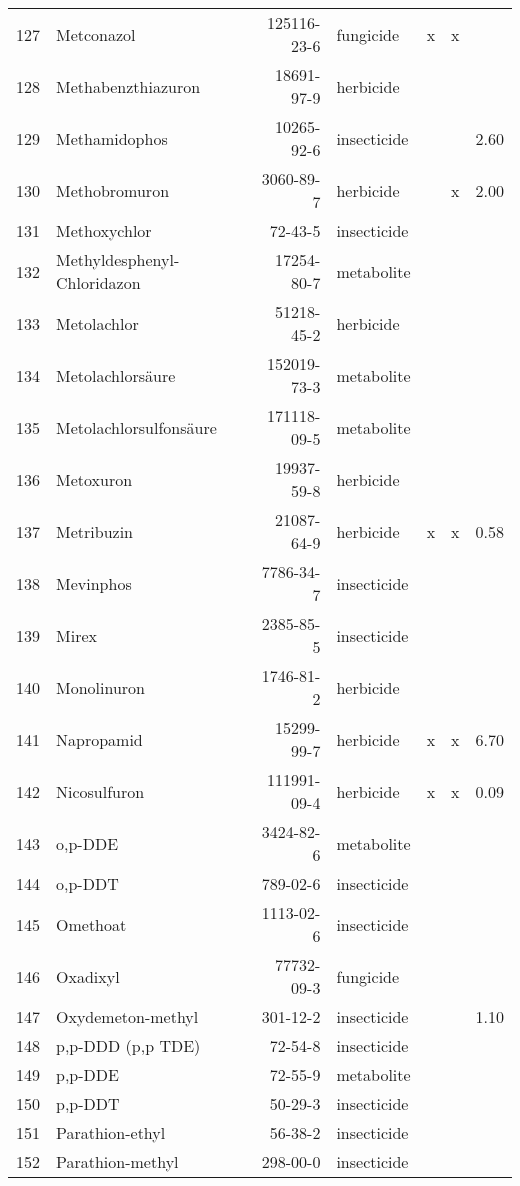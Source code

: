 \begin{longtable}{lp{3cm}rlp{0.5cm}p{0.5cm}p{1cm}}
  127 & Metconazol & 125116-23-6 & fungicide & x & x &  \\ 
  128 & Methabenzthiazuron & 18691-97-9 & herbicide &  &  &  \\ 
  129 & Methamidophos & 10265-92-6 & insecticide &  &  & 2.60 \\ 
  130 & Methobromuron & 3060-89-7 & herbicide &  & x & 2.00 \\ 
  131 & Methoxychlor & 72-43-5 & insecticide &  &  &  \\ 
  132 & Methyldesphenyl-Chloridazon & 17254-80-7 & metabolite &  &  &  \\ 
  133 & Metolachlor & 51218-45-2 & herbicide &  &  &  \\ 
  134 & Metolachlorsäure & 152019-73-3 & metabolite &  &  &  \\ 
  135 & Metolachlorsulfonsäure & 171118-09-5 & metabolite &  &  &  \\ 
  136 & Metoxuron & 19937-59-8 & herbicide &  &  &  \\ 
  137 & Metribuzin & 21087-64-9 & herbicide & x & x & 0.58 \\ 
  138 & Mevinphos & 7786-34-7 & insecticide &  &  &  \\ 
  139 & Mirex & 2385-85-5 & insecticide &  &  &  \\ 
  140 & Monolinuron & 1746-81-2 & herbicide &  &  &  \\ 
  141 & Napropamid & 15299-99-7 & herbicide & x & x & 6.70 \\ 
  142 & Nicosulfuron & 111991-09-4 & herbicide & x & x & 0.09 \\ 
  143 & o,p-DDE & 3424-82-6 & metabolite &  &  &  \\ 
  144 & o,p-DDT & 789-02-6 & insecticide &  &  &  \\ 
  145 & Omethoat & 1113-02-6 & insecticide &  &  &  \\ 
  146 & Oxadixyl & 77732-09-3 & fungicide &  &  &  \\ 
  147 & Oxydemeton-methyl & 301-12-2 & insecticide &  &  & 1.10 \\ 
  148 & p,p-DDD (p,p TDE) & 72-54-8 & insecticide &  &  &  \\ 
  149 & p,p-DDE & 72-55-9 & metabolite &  &  &  \\ 
  150 & p,p-DDT & 50-29-3 & insecticide &  &  &  \\ 
  151 & Parathion-ethyl & 56-38-2 & insecticide &  &  &  \\ 
  152 & Parathion-methyl & 298-00-0 & insecticide &  &  &  \\ 

\end{longtable}
